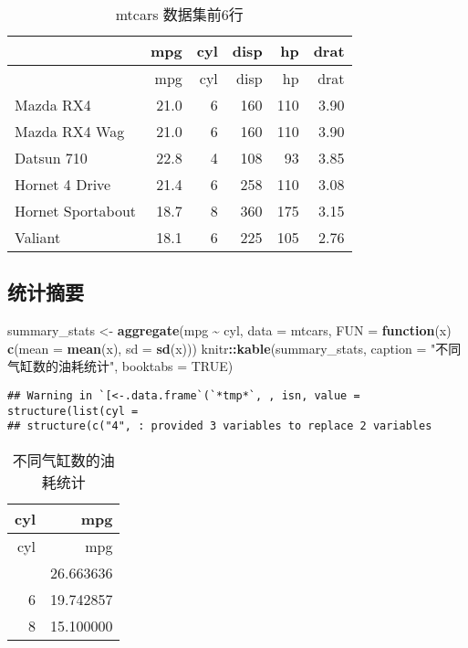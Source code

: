 \documentclass[
]{article}
\newenvironment{Shaded}{\begin{snugshade}}{\end{snugshade}}
\newcommand{\AttributeTok}[1]{\textcolor[rgb]{0.13,0.29,0.53}{#1}}
\newcommand{\ConstantTok}[1]{\textcolor[rgb]{0.56,0.35,0.01}{#1}}
\newcommand{\ControlFlowTok}[1]{\textcolor[rgb]{0.13,0.29,0.53}{\textbf{#1}}}
\newcommand{\FunctionTok}[1]{\textcolor[rgb]{0.13,0.29,0.53}{\textbf{#1}}}
\newcommand{\NormalTok}[1]{#1}
\newcommand{\OtherTok}[1]{\textcolor[rgb]{0.56,0.35,0.01}{#1}}
\newcommand{\SpecialCharTok}[1]{\textcolor[rgb]{0.81,0.36,0.00}{\textbf{#1}}}
\newcommand{\StringTok}[1]{\textcolor[rgb]{0.31,0.60,0.02}{#1}}
\begin{document}
\begin{longtable}[]{@{}lrrrrr@{}}
\caption{mtcars 数据集前6行}\tabularnewline
\toprule\noalign{}
& mpg & cyl & disp & hp & drat \\
\midrule\noalign{}
\endfirsthead
\toprule\noalign{}
& mpg & cyl & disp & hp & drat \\
\midrule\noalign{}
\endhead
\bottomrule\noalign{}
\endlastfoot
Mazda RX4 & 21.0 & 6 & 160 & 110 & 3.90 \\
Mazda RX4 Wag & 21.0 & 6 & 160 & 110 & 3.90 \\
Datsun 710 & 22.8 & 4 & 108 & 93 & 3.85 \\
Hornet 4 Drive & 21.4 & 6 & 258 & 110 & 3.08 \\
Hornet Sportabout & 18.7 & 8 & 360 & 175 & 3.15 \\
Valiant & 18.1 & 6 & 225 & 105 & 2.76 \\
\end{longtable}

\subsection{统计摘要}\label{ux7edfux8ba1ux6458ux8981}

\begin{Shaded}
\begin{Highlighting}[]
\NormalTok{summary\_stats }\OtherTok{\textless{}{-}} \FunctionTok{aggregate}\NormalTok{(mpg }\SpecialCharTok{\textasciitilde{}}\NormalTok{ cyl, }\AttributeTok{data =}\NormalTok{ mtcars, }
                         \AttributeTok{FUN =} \ControlFlowTok{function}\NormalTok{(x) }\FunctionTok{c}\NormalTok{(}\AttributeTok{mean =} \FunctionTok{mean}\NormalTok{(x), }
                                           \AttributeTok{sd =} \FunctionTok{sd}\NormalTok{(x)))}
\NormalTok{knitr}\SpecialCharTok{::}\FunctionTok{kable}\NormalTok{(summary\_stats,}
             \AttributeTok{caption =} \StringTok{"不同气缸数的油耗统计"}\NormalTok{,}
             \AttributeTok{booktabs =} \ConstantTok{TRUE}\NormalTok{)}
\end{Highlighting}
\end{Shaded}

\begin{verbatim}
## Warning in `[<-.data.frame`(`*tmp*`, , isn, value = structure(list(cyl =
## structure(c("4", : provided 3 variables to replace 2 variables
\end{verbatim}

\begin{longtable}[]{@{}rr@{}}
\caption{不同气缸数的油耗统计}\tabularnewline
\toprule\noalign{}
cyl & mpg \\
\midrule\noalign{}
\endfirsthead
\toprule\noalign{}
cyl & mpg \\
\midrule\noalign{}
\endhead
\bottomrule\noalign{}
\endlastfoot
4 & 26.663636 \\
6 & 19.742857 \\
8 & 15.100000 \\
\end{longtable}
\end{document}
